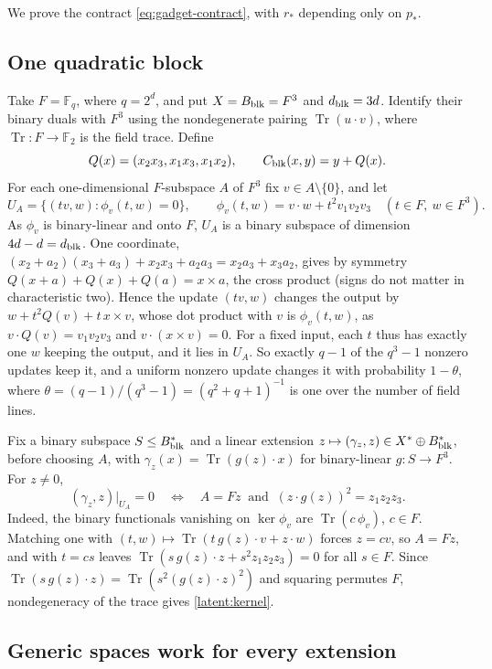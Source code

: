\documentclass[11pt]{article}
\newcommand{\F}{\mathbb F}
\newcommand{\Tr}{\operatorname{Tr}}
\begin{document}
We prove the contract \eqref{eq:gadget-contract}, with $r_*$ depending only on $p_*$.

\subsection{One quadratic block}

Take $F=\F_q$, where $q=2^d$, and put $X=B_{\rm blk}=F^3$ and $d_{\rm blk}=3d$.
Identify their binary duals with $F^3$ using the nondegenerate pairing
$\Tr(u\cdot v)$, where $\Tr:F\to\F_2$ is the field trace. Define
\[
 Q(x)=(x_2x_3,x_1x_3,x_1x_2),\qquad
 C_{\rm blk}(x,y)=y+Q(x).
\]
For each one-dimensional $F$-subspace $A$ of $F^3$ fix $v\in A\setminus\{0\}$, and let
\[
 U_A=\{(tv,w):\phi_v(t,w)=0\},\qquad
 \phi_v(t,w)=v\cdot w+t^2v_1v_2v_3\quad(t\in F,\ w\in F^3).
\]
As $\phi_v$ is binary-linear and onto $F$, $U_A$ is a binary subspace of
dimension $4d-d=d_{\rm blk}$. One coordinate,
$(x_2+a_2)(x_3+a_3)+x_2x_3+a_2a_3=x_2a_3+x_3a_2$, gives by symmetry
$Q(x+a)+Q(x)+Q(a)=x\times a$, the cross product (signs do not matter in
characteristic two). Hence the update $(tv,w)$ changes the output by
$w+t^2Q(v)+t\,x\times v$, whose dot product with $v$ is $\phi_v(t,w)$, as
$v\cdot Q(v)=v_1v_2v_3$ and $v\cdot(x\times v)=0$. For a fixed input, each
$t$ thus has exactly one $w$ keeping the output, and it lies in $U_A$. So
exactly $q-1$ of the $q^3-1$ nonzero updates keep it, and a uniform nonzero
update changes it with probability $1-\theta$, where
$\theta=(q-1)/(q^3-1)=(q^2+q+1)^{-1}$ is one over the number of field
lines.

Fix a binary subspace $S\le B_{\rm blk}^*$ and a linear extension
$z\mapsto(\gamma_z,z)\in X^*\oplus B_{\rm blk}^*$, before choosing $A$,
with $\gamma_z(x)=\Tr(g(z)\cdot x)$ for binary-linear $g:S\to F^3$. For
$z\ne0$,
\begin{equation}
 (\gamma_z,z)|_{U_A}=0
 \quad\Longleftrightarrow\quad
 A=Fz\ \text{ and }\ (z\cdot g(z))^2=z_1z_2z_3.
 \label{latent:kernel}
\end{equation}
Indeed, the binary functionals vanishing on $\ker\phi_v$ are
$\Tr(c\,\phi_v)$, $c\in F$. Matching one with $(t,w)\mapsto\Tr(t\,g(z)\cdot
v+z\cdot w)$ forces $z=cv$, so $A=Fz$, and with $t=cs$ leaves
$\Tr(s\,g(z)\cdot z+s^2z_1z_2z_3)=0$ for all $s\in F$. Since
$\Tr(s\,g(z)\cdot z)=\Tr(s^2(g(z)\cdot z)^2)$ and squaring permutes $F$,
nondegeneracy of the trace gives \eqref{latent:kernel}.

\subsection{Generic spaces work for every extension}
\end{document}
